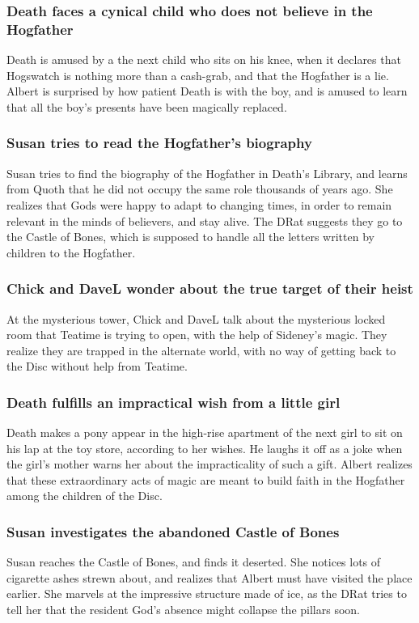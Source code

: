 \subsubsection{\Gls{Death} faces a cynical child who does not believe in the Hogfather}
\Gls{Death} is amused by a the next child who sits on his knee, when it declares that Hogswatch is
nothing more than a cash-grab, and that the Hogfather is a lie. \Gls{Albert} is surprised by how
patient \Gls{Death} is with the boy, and is amused to learn that all the boy's presents have been
magically replaced.

\subsubsection{\Gls{Susan} tries to read the Hogfather's biography}
\Gls{Susan} tries to find the biography of the Hogfather in \Gls{Death}'s Library, and learns from
\Gls{Quoth} that he did not occupy the same role thousands of years ago. She realizes that Gods were
happy to adapt to changing times, in order to remain relevant in the minds of believers, and stay
alive. The \Gls{DRat} suggests they go to the Castle of Bones, which is supposed to handle all the
letters written by children to the Hogfather.

\subsubsection{\Gls{Chick} and \Gls{DaveL} wonder about the true target of their heist}
At the mysterious tower, \Gls{Chick} and \Gls{DaveL} talk about the mysterious locked room that
\Gls{Teatime} is trying to open, with the help of \Gls{Sideney}'s magic. They realize they are
trapped in the alternate world, with no way of getting back to the Disc without help from
\Gls{Teatime}.

\subsubsection{\Gls{Death} fulfills an impractical wish from a little girl}
\Gls{Death} makes a pony appear in the high-rise apartment of the next girl to sit on his lap at the
toy store, according to her wishes. He laughs it off as a joke when the girl's mother warns her
about the impracticality of such a gift. \Gls{Albert} realizes that these extraordinary acts of
magic are meant to build faith in the Hogfather among the children of the Disc.

\subsubsection{\Gls{Susan} investigates the abandoned Castle of Bones}
\Gls{Susan} reaches the Castle of Bones, and finds it deserted. She notices lots of cigarette ashes
strewn about, and realizes that \Gls{Albert} must have visited the place earlier. She marvels at
the impressive structure made of ice, as the \Gls{DRat} tries to tell her that the resident God's
absence might collapse the pillars soon.

